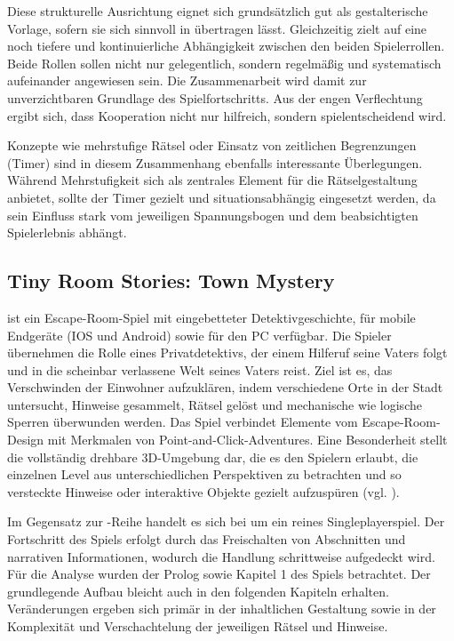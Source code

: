 Diese strukturelle Ausrichtung eignet sich grundsätzlich gut als gestalterische Vorlage, sofern sie sich sinnvoll in  übertragen lässt. Gleichzeitig zielt  auf eine noch tiefere und kontinuierliche Abhängigkeit zwischen den beiden Spielerrollen. Beide Rollen sollen nicht nur gelegentlich, sondern regelmäßig und systematisch aufeinander angewiesen sein. Die Zusammenarbeit wird damit zur unverzichtbaren Grundlage des Spielfortschritts. Aus der engen Verflechtung ergibt sich, dass Kooperation nicht nur hilfreich, sondern spielentscheidend wird.

Konzepte wie mehrstufige Rätsel oder Einsatz von zeitlichen Begrenzungen (Timer) sind in diesem Zusammenhang ebenfalls interessante Überlegungen. Während Mehrstufigkeit sich als zentrales Element für die Rätselgestaltung anbietet, sollte der Timer gezielt und situationsabhängig eingesetzt werden, da sein Einfluss stark vom jeweiligen Spannungsbogen und dem beabsichtigten Spielerlebnis abhängt.

\subsection{Tiny Room Stories: Town Mystery}
 ist ein Escape-Room-Spiel mit eingebetteter Detektivgeschichte, für mobile Endgeräte (IOS und Android) sowie für den PC verfügbar. Die Spieler übernehmen die Rolle eines Privatdetektivs, der einem Hilferuf seine Vaters folgt und in die scheinbar verlassene Welt  seines Vaters reist. Ziel ist es, das Verschwinden der Einwohner aufzuklären, indem verschiedene Orte in der Stadt untersucht, Hinweise gesammelt, Rätsel gelöst und mechanische wie logische Sperren überwunden werden. 
Das Spiel verbindet Elemente vom Escape-Room-Design mit Merkmalen von Point-and-Click-Adventures. Eine Besonderheit stellt die vollständig drehbare \ac{3D}-Umgebung dar, die es den Spielern erlaubt, die einzelnen Level aus unterschiedlichen Perspektiven zu betrachten und so versteckte Hinweise oder interaktive Objekte gezielt aufzuspüren (vgl. \citealp{kiary_games_tiny_2021}).

Im Gegensatz zur -Reihe handelt es sich bei  um ein reines Singleplayerspiel. Der Fortschritt des Spiels erfolgt durch das Freischalten von Abschnitten und narrativen Informationen, wodurch die Handlung schrittweise aufgedeckt wird. Für die Analyse wurden der Prolog sowie Kapitel 1 des Spiels betrachtet. Der grundlegende Aufbau bleicht auch in den folgenden Kapiteln erhalten. Veränderungen ergeben sich primär in der inhaltlichen Gestaltung sowie in der Komplexität und Verschachtelung der jeweiligen Rätsel und Hinweise.

